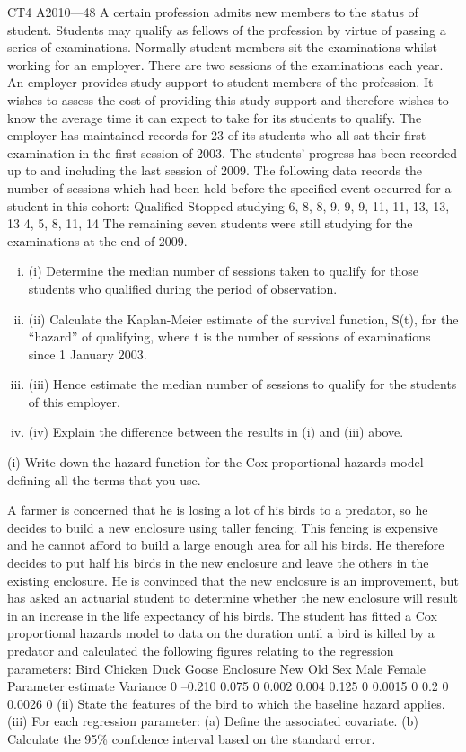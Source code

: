 \documentclass[a4paper,12pt]{article}
\begin{document}
\begin{enumerate}
CT4 A2010—48
A certain profession admits new members to the status of student. Students may
qualify as fellows of the profession by virtue of passing a series of examinations.
Normally student members sit the examinations whilst working for an employer.
There are two sessions of the examinations each year.
An employer provides study support to student members of the profession. It wishes
to assess the cost of providing this study support and therefore wishes to know the
average time it can expect to take for its students to qualify.
The employer has maintained records for 23 of its students who all sat their first
examination in the first session of 2003. The students’ progress has been recorded up
to and including the last session of 2009. The following data records the number of
sessions which had been held before the specified event occurred for a student in this
cohort:
Qualified
Stopped studying
6, 8, 8, 9, 9, 9, 11, 11, 13, 13, 13
4, 5, 8, 11, 14
The remaining seven students were still studying for the examinations at the end of
2009.
\begin{enumerate}[(i)]
\item (i) Determine the median number of sessions taken to qualify for those students
who qualified during the period of observation.
\item  
(ii) Calculate the Kaplan-Meier estimate of the survival function, S(t), for the
“hazard” of qualifying, where t is the number of sessions of examinations
since 1 January 2003.
\item  
(iii) Hence estimate the median number of sessions to qualify for the students of
this employer.
\item  
(iv) Explain the difference between the results in (i) and (iii) above.
\end{enumerate}
(i)
Write down the hazard function for the Cox proportional hazards model defining all the terms that you use.
 
A farmer is concerned that he is losing a lot of his birds to a predator, so he decides to build a new enclosure using taller fencing. This fencing is expensive and he cannot afford to build a large enough area for all his birds. He therefore decides to put half
his birds in the new enclosure and leave the others in the existing enclosure. He is convinced that the new enclosure is an improvement, but has asked an actuarial student to determine whether the new enclosure will result in an increase in the life
expectancy of his birds. The student has fitted a Cox proportional hazards model to
data on the duration until a bird is killed by a predator and calculated the following
figures relating to the regression parameters:
Bird Chicken
Duck
Goose
Enclosure New
Old
Sex Male
Female
Parameter estimate Variance
0
–0.210
0.075 0
0.002
0.004
0.125
0 0.0015
0
0.2
0 0.0026
0
(ii) State the features of the bird to which the baseline hazard applies.
(iii) For each regression parameter:
(a) Define the associated covariate.
(b) Calculate the 95\% confidence interval based on the standard error.
 

\end{enumerate}
\end{document}
